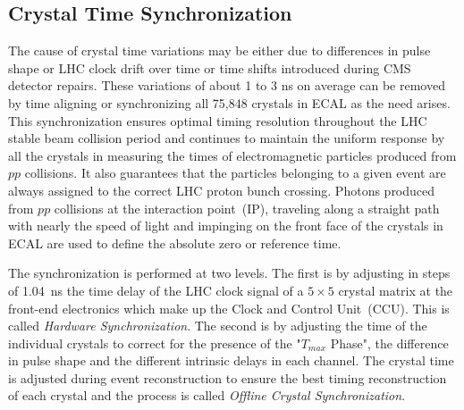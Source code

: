 \subsection{Crystal Time Synchronization}
The cause of crystal time variations may be either due to differences in pulse shape or LHC clock drift over time or time shifts introduced during CMS detector repairs. These variations of about 1 to 3 ns on average can be removed by time aligning or synchronizing all 75,848 \pb crystals in ECAL as the need arises. This synchronization ensures optimal timing resolution throughout the LHC stable beam collision period and continues to maintain the uniform response by all the crystals in measuring the times of electromagnetic particles produced from $pp$ collisions. It also guarantees that the particles  belonging to a given event are always assigned to the correct LHC proton bunch crossing. 
\newline
Photons produced from $pp$ collisions at the interaction point~(IP), traveling along a straight path with nearly the speed of light and impinging on the front face of the crystals in ECAL are used to define the absolute zero or reference time. 
\par 
The synchronization is performed at two levels. The first is by adjusting in steps of 1.04~ns the time delay of the LHC clock signal of a $5\times5$ crystal matrix at the front-end electronics which make up the Clock and Control Unit~(CCU). This is called \textit{Hardware Synchronization}. The second is by adjusting the time of the individual crystals to correct for the presence of the "$T_{max}$ Phase", the difference in pulse shape and the different intrinsic delays in each channel. The crystal time is adjusted during event reconstruction to ensure the best timing reconstruction of each crystal and the process is called \textit{Offline Crystal Synchronization}.
